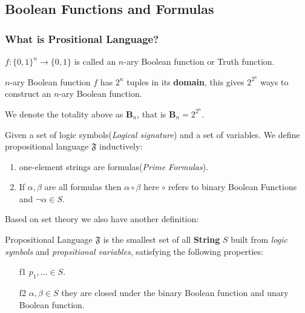 \documentclass[11pt]{article}
\begin{document}
\subsection{Boolean Functions and Formulas}
\label{sec:org5897f19}
\subsubsection{What is Prositional Language?}
\label{sec:orgd5acf80}
\begin{definition}
\(f:\{0,1\}^n\to\{0,1\}\) is called an \(n\)-ary Boolean function or Truth function.
\end{definition}

\begin{proposition}
\(n\)-ary Boolean function \(f\) has \(2^n\) tuples in its \textbf{domain}, this gives \(2^{2^n}\) ways to construct an \(n\)-ary Boolean function.
\end{proposition}

\begin{definition}
We denote the totality above as \(\mathbf{B}_n\), that is \(\mathbf{B}_n=2^{2^n}\).
\end{definition}

\begin{definition}
Given a set of logic symbols(\emph{Logical signature}) and a set of variables. We define propositional language \(\mathfrak{F}\) inductively:
\begin{enumerate}
\item one-element strings are formulas(\emph{Prime Formulas}).
\item If \(\alpha, \beta\) are all formulas then \(\alpha \circ \beta\) here \(\circ\) refers to binary Boolean Functions and \(\lnot\alpha\in S.\)
\end{enumerate}
\end{definition}


Based on set theory we also have another definition:
\begin{definition}
Propositional Language \(\mathfrak{F}\) is the smallest set of all \textbf{String} \(S\) built from \emph{logic symbols} and \emph{propsitional variables}, satisfying the following properties:
\begin{itemize}
\item[f1] \(p_1,\dots\in S.\)
\item[f2] \(\alpha,\beta\in S\) they are closed under the binary Boolean function and unary Boolean function.
\end{itemize}
\end{definition}
\end{document}
